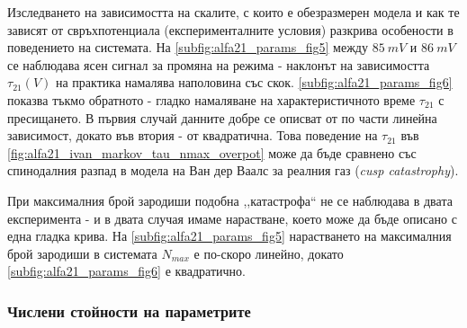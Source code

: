 Изследването на зависимостта на скалите, с които е обезразмерен модела и как те зависят от свръхпотенциала (експерименталните условия) разкрива особености в поведението на системата.  На \autoref{subfig:alfa21_params_fig5} между $85~mV$ и $86~mV$ се наблюдава ясен сигнал за промяна на режима - наклонът на зависимостта $\tau_{21} (V)$ на практика намалява наполовина със скок. \autoref{subfig:alfa21_params_fig6} показва тъкмо обратното - гладко намаляване на характеристичното време $\tau_{21}$ с пресищането. В първия случай данните добре се описват от по части линейна зависимост, докато във втория - от квадратична.  Това поведение на $\tau_{21}$ във \autoref{fig:alfa21_ivan_markov_tau_nmax_overpot} може да бъде сравнено със спинодалния разпад в модела на Ван дер Ваалс за реалния газ (\textit{cusp catastrophy}).

При максималния брой зародиши подобна ,,катастрофа`` не се наблюдава в двата експеримента - и в двата случая имаме нарастване, което може да бъде описано с една гладка крива. На \autoref{subfig:alfa21_params_fig5} нарастването на максималния брой зародиши в системата $N_{max}$ е по-скоро линейно, докато \autoref{subfig:alfa21_params_fig6} е квадратично.

\subsubsection{Числени стойности на параметрите}

